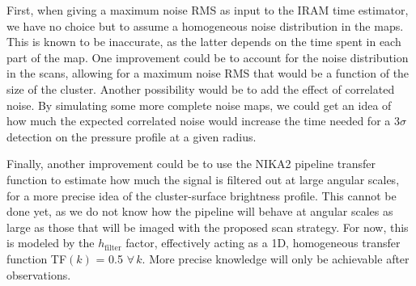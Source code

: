 \documentclass[11pt]{article}
\begin{document}
First, when giving a maximum noise RMS as input to the IRAM time estimator, we have no choice but to assume a homogeneous noise distribution in the maps.
This is known to be inaccurate, as the latter depends on the time spent in each part of the map.
One improvement could be to account for the noise distribution in the scans, allowing for a maximum noise RMS that would be a function of the size of the cluster.
Another possibility would be to add the effect of correlated noise.
By simulating some more complete noise maps, we could get an idea of how much the expected correlated noise would increase the time needed for a $3\sigma$ detection on the pressure profile at a given radius.

Finally, another improvement could be to use the NIKA2 pipeline transfer function to estimate how much the signal is filtered out at large angular scales, for a more precise idea of the cluster-surface brightness profile.
This cannot be done yet, as we do not know how the pipeline will behave at angular scales as large as those that will be imaged with the proposed scan strategy.
For now, this is modeled by the $h_\mathrm{filter}$ factor, effectively acting as a 1D, homogeneous transfer function TF$(k)$ = 0.5 $\forall\,k$.
More precise knowledge will only be achievable after observations.

\newpage
{}


\end{document}
